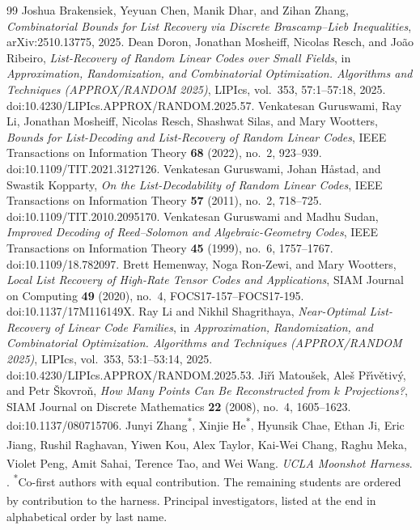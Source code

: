 \documentclass[10pt,a4paper]{amsart}
\begin{document}
\begin{thebibliography}{99}
 Joshua Brakensiek, Yeyuan Chen, Manik Dhar, and Zihan Zhang, \emph{Combinatorial Bounds for List Recovery via Discrete Brascamp--Lieb Inequalities}, arXiv:2510.13775, 2025.
 Dean Doron, Jonathan Mosheiff, Nicolas Resch, and Jo\~ao Ribeiro, \emph{List-Recovery of Random Linear Codes over Small Fields}, in \emph{Approximation, Randomization, and Combinatorial Optimization. Algorithms and Techniques (APPROX/RANDOM 2025)}, LIPIcs, vol.~353, 57:1--57:18, 2025. doi:10.4230/LIPIcs.APPROX/RANDOM.2025.57.
 Venkatesan Guruswami, Ray Li, Jonathan Mosheiff, Nicolas Resch, Shashwat Silas, and Mary Wootters, \emph{Bounds for List-Decoding and List-Recovery of Random Linear Codes}, IEEE Transactions on Information Theory \textbf{68} (2022), no.~2, 923--939. doi:10.1109/TIT.2021.3127126.
 Venkatesan Guruswami, Johan H\aa stad, and Swastik Kopparty, \emph{On the List-Decodability of Random Linear Codes}, IEEE Transactions on Information Theory \textbf{57} (2011), no.~2, 718--725. doi:10.1109/TIT.2010.2095170.
 Venkatesan Guruswami and Madhu Sudan, \emph{Improved Decoding of Reed--Solomon and Algebraic-Geometry Codes}, IEEE Transactions on Information Theory \textbf{45} (1999), no.~6, 1757--1767. doi:10.1109/18.782097.
 Brett Hemenway, Noga Ron-Zewi, and Mary Wootters, \emph{Local List Recovery of High-Rate Tensor Codes and Applications}, SIAM Journal on Computing \textbf{49} (2020), no.~4, FOCS17-157--FOCS17-195. doi:10.1137/17M116149X.
 Ray Li and Nikhil Shagrithaya, \emph{Near-Optimal List-Recovery of Linear Code Families}, in \emph{Approximation, Randomization, and Combinatorial Optimization. Algorithms and Techniques (APPROX/RANDOM 2025)}, LIPIcs, vol.~353, 53:1--53:14, 2025. doi:10.4230/LIPIcs.APPROX/RANDOM.2025.53.
 Ji\v{r}\'{\i} Matou\v{s}ek, Ale\v{s} P\v{r}\'{\i}v\v{e}tiv\'y, and Petr \v{S}kovro\v{n}, \emph{How Many Points Can Be Reconstructed from \(k\) Projections?}, SIAM Journal on Discrete Mathematics \textbf{22} (2008), no.~4, 1605--1623. doi:10.1137/080715706.
 Junyi Zhang\textsuperscript{*}, Xinjie He\textsuperscript{*}, Hyunsik Chae, Ethan Ji, Eric Jiang, Rushil Raghavan, Yiwen Kou, Alex Taylor, Kai-Wei Chang\textsuperscript{\textdagger}, Raghu Meka\textsuperscript{\textdagger}, Violet Peng\textsuperscript{\textdagger}, Amit Sahai\textsuperscript{\textdagger}, Terence Tao\textsuperscript{\textdagger}, and Wei Wang\textsuperscript{\textdagger}. \newblock \emph{UCLA Moonshot Harness}. . \newblock \textsuperscript{*}Co-first authors with equal contribution. The remaining students are ordered by contribution to the harness. \textsuperscript{\textdagger}Principal investigators, listed at the end in alphabetical order by last name.

\end{thebibliography}
\end{document}
